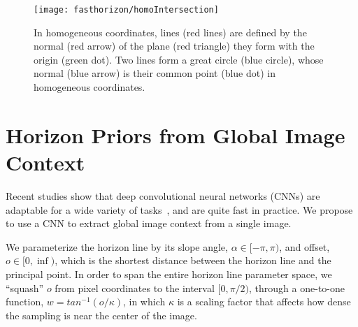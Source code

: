 
\begin{figure}
  \centering
  \texttt{[image: fasthorizon/homoIntersection]}
  \caption{In homogeneous coordinates, lines (red lines) are defined
    by the normal (red arrow) of the plane (red triangle) they form
    with the origin (green dot). Two lines form a great circle (blue
    circle), whose normal (blue arrow) is their common point (blue
    dot) in homogeneous coordinates.}
  \label{fig:homoIntersection}
\end{figure}


\section{Horizon Priors from Global Image Context}
\label{sec:deeplearning}

Recent studies show that deep convolutional neural networks (CNNs) are
adaptable for a wide variety of tasks~\cite{yosinski2014transferable},
and are quite fast in practice.  We propose to use a CNN to extract
global image context from a single image.


We parameterize the horizon line by its slope angle, $\alpha \in
[-\pi, \pi)$, and offset, $o \in [0, \inf)$, which is the shortest
distance between the horizon line and the principal point. In order to
span the entire horizon line parameter space, we ``squash'' $o$ from
pixel coordinates to the interval $[0, \pi/2)$, through a one-to-one
function, $w = tan^{-1}(o / \kappa)$, in which $\kappa$ is a
scaling factor that affects how dense the sampling is near the center
of the image.


